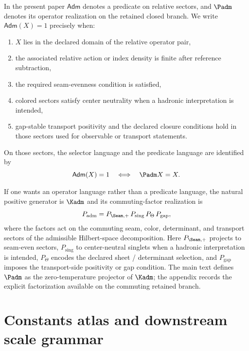 \begin{definition}
In the present paper $\mathsf{Adm}$ denotes a predicate on relative sectors, and $\Padm$ denotes its operator realization on the retained closed branch. We write $\mathsf{Adm}(X)=1$ precisely when:
\begin{enumerate}[label=(\arabic*), leftmargin=1.5em, topsep=3pt, itemsep=2pt]
    \item $X$ lies in the declared domain of the relative operator pair,
    \item the associated relative action or index density is finite after reference subtraction,
    \item the required seam-evenness condition is satisfied,
    \item colored sectors satisfy center neutrality when a hadronic interpretation is intended,
    \item gap-stable transport positivity and the declared closure conditions hold in those sectors used for observable or transport statements.
\end{enumerate}
On those sectors, the selector language and the predicate language are identified by
\[
\mathsf{Adm}(X)=1
\quad\Longleftrightarrow\quad
\Padm X=X.
\]
\end{definition}

\begin{remark}
If one wants an operator language rather than a predicate language, the natural positive generator is $\Kadm$ and its commuting-factor realization is
\[
P_{\mathrm{adm}}=P_{\Seam,+}\,P_{\mathrm{sing}}\,P_{\Theta}\,P_{\mathrm{gap}},
\]
where the factors act on the commuting seam, color, determinant, and transport sectors of the admissible Hilbert-space decomposition. Here $P_{\Seam,+}$ projects to seam-even sectors, $P_{\mathrm{sing}}$ to center-neutral singlets when a hadronic interpretation is intended, $P_{\Theta}$ encodes the declared sheet / determinant selection, and $P_{\mathrm{gap}}$ imposes the transport-side positivity or gap condition. The main text defines $\Padm$ as the zero-temperature projector of $\Kadm$; the appendix records the explicit factorization available on the commuting retained branch.
\end{remark}

\section{Constants atlas and downstream scale grammar}
\label{app:constants}

